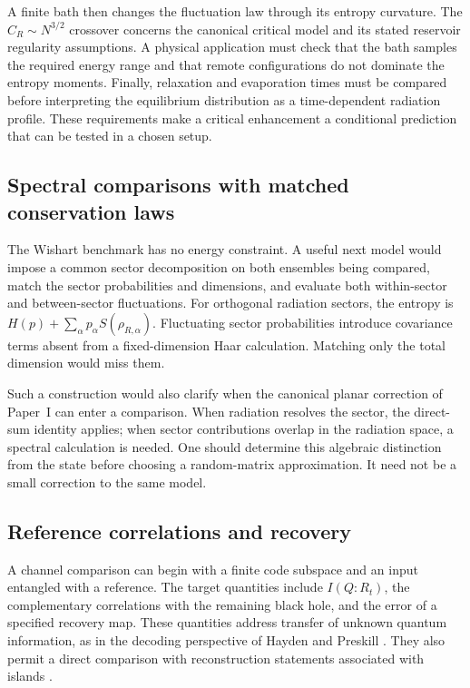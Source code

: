 \documentclass[11pt,letterpaper]{article}
\theoremstyle{plain}
\theoremstyle{definition}
\theoremstyle{remark}
\begin{document}
A finite bath then changes the fluctuation law through its entropy
curvature. The $C_R\sim N^{3/2}$ crossover concerns the canonical
critical model and its stated reservoir regularity assumptions. A
physical application must check that the bath samples the required
energy range and that remote configurations do not dominate the entropy
moments. Finally, relaxation and evaporation times must be compared
before interpreting the equilibrium distribution as a time-dependent
radiation profile. These requirements make a critical enhancement a
conditional prediction that can be tested in a chosen setup.

\subsection{Spectral comparisons with matched conservation laws}

The Wishart benchmark has no energy constraint. A useful next model
would impose a common sector decomposition on both ensembles being
compared, match the sector probabilities and dimensions, and evaluate
both within-sector and between-sector fluctuations. For orthogonal
radiation sectors, the entropy is
$H(p)+\sum_\alpha p_\alpha S(\rho_{R,\alpha})$.
Fluctuating sector probabilities introduce covariance terms absent from
a fixed-dimension Haar calculation. Matching only the total dimension
would miss them.

Such a construction would also clarify when the canonical planar
correction of Paper~I can enter a comparison. When radiation resolves
the sector, the direct-sum identity applies; when sector contributions
overlap in the radiation space, a spectral calculation is needed.
One should determine this algebraic distinction from the state before
choosing a random-matrix approximation. It need not be a small
correction to the same model.

\subsection{Reference correlations and recovery}

A channel comparison can begin with a finite code subspace and an input
entangled with a reference. The target quantities include
$I(Q:R_t)$, the complementary correlations with the remaining black
hole, and the error of a specified recovery map. These quantities
address transfer of unknown quantum information, as in the decoding
perspective of Hayden and Preskill \cite{haydenpreskill2007}. They also
permit a direct comparison with reconstruction statements associated
with islands \cite{penington2020,pssyetal2022}.
\end{document}
